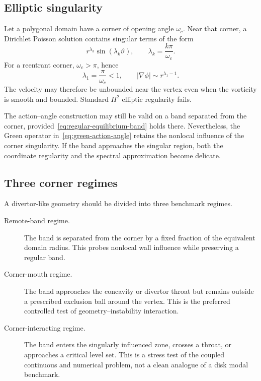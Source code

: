 \documentclass[11pt,a4paper]{article}
\newcommand{\abs}[1]{\left|#1\right|}
\begin{document}
\subsection{Elliptic singularity}

Let a polygonal domain have a corner of opening angle $\omega_c$. Near that corner, a Dirichlet Poisson solution contains singular terms of the form
\begin{equation}
  r^{\lambda_k}\sin(\lambda_k\vartheta),
  \qquad
  \lambda_k=\frac{k\pi}{\omega_c}.
  \label{eq:corner-expansion}
\end{equation}
For a reentrant corner, $\omega_c>\pi$, hence
\begin{equation}
  \lambda_1=\frac{\pi}{\omega_c}<1,
  \qquad
  \abs{\nabla\phi}\sim r^{\lambda_1-1}.
  \label{eq:corner-gradient}
\end{equation}
The velocity may therefore be unbounded near the vertex even when the vorticity is smooth and bounded. Standard $H^2$ elliptic regularity fails.

The action--angle construction may still be valid on a band separated from the corner, provided~\eqref{eq:regular-equilibrium-band} holds there. Nevertheless, the Green operator in~\eqref{eq:green-action-angle} retains the nonlocal influence of the corner singularity. If the band approaches the singular region, both the coordinate regularity and the spectral approximation become delicate.

\subsection{Three corner regimes}

A divertor-like geometry should be divided into three benchmark regimes.

\begin{description}
  \item[Remote-band regime.] The band is separated from the corner by a fixed fraction of the equivalent domain radius. This probes nonlocal wall influence while preserving a regular band.

  \item[Corner-mouth regime.] The band approaches the concavity or divertor throat but remains outside a prescribed exclusion ball around the vertex. This is the preferred controlled test of geometry--instability interaction.

  \item[Corner-interacting regime.] The band enters the singularly influenced zone, crosses a throat, or approaches a critical level set. This is a stress test of the coupled continuous and numerical problem, not a clean analogue of a disk modal benchmark.
\end{description}
\end{document}
